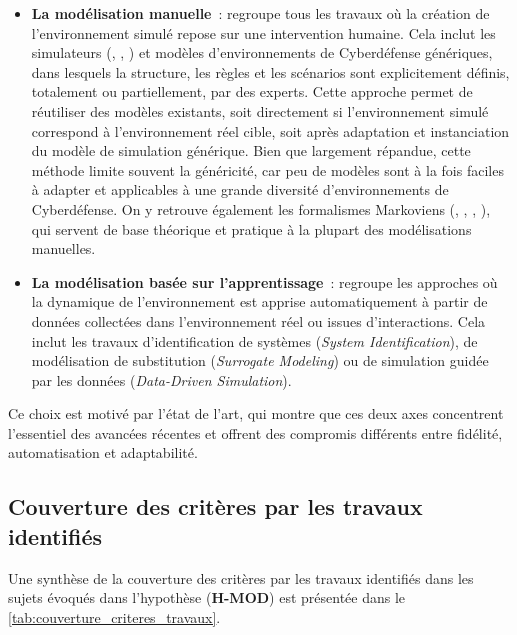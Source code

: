 \begin{itemize}
  \item \textbf{La modélisation manuelle}~: regroupe tous les travaux où la création de l'environnement simulé repose sur une intervention humaine. Cela inclut les simulateurs (, , ) et modèles d'environnements de Cyberdéfense génériques, dans lesquels la structure, les règles et les scénarios sont explicitement définis, totalement ou partiellement, par des experts. Cette approche permet de réutiliser des modèles existants, soit directement si l'environnement simulé correspond à l'environnement réel cible, soit après adaptation et instanciation du modèle de simulation générique. Bien que largement répandue, cette méthode limite souvent la généricité, car peu de modèles sont à la fois faciles à adapter et applicables à une grande diversité d'environnements de Cyberdéfense. On y retrouve également les formalismes Markoviens (, , , ), qui servent de base théorique et pratique à la plupart des modélisations manuelles.
  \item \textbf{La modélisation basée sur l'apprentissage}~: regroupe les approches où la dynamique de l'environnement est apprise automatiquement à partir de données collectées dans l'environnement réel ou issues d'interactions. Cela inclut les travaux d'identification de systèmes (\textit{System Identification}), de modélisation de substitution (\textit{Surrogate Modeling}) ou de simulation guidée par les données (\textit{Data-Driven Simulation}).
\end{itemize}

Ce choix est motivé par l'état de l'art, qui montre que ces deux axes concentrent l'essentiel des avancées récentes et offrent des compromis différents entre fidélité, automatisation et adaptabilité.

\subsection*{Couverture des critères par les travaux identifiés}

Une synthèse de la couverture des critères par les travaux identifiés dans les sujets évoqués dans l'hypothèse (\textbf{H-MOD}) est présentée dans le \autoref{tab:couverture_criteres_travaux}.


